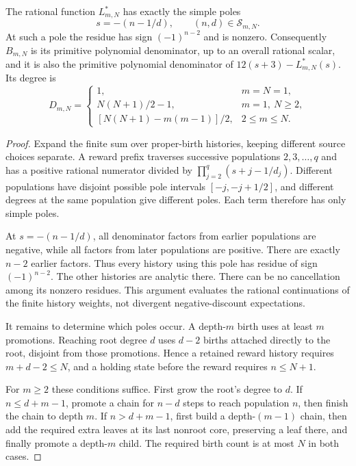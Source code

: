\begin{theorem}
\label{pop:poles}
The rational function $L^*_{m,N}$ has exactly the simple poles
\[
 s=-(n-1/d),\qquad(n,d)\in\mathcal S_{m,N}.
\]
At such a pole the residue has sign $(-1)^{n-2}$ and is nonzero.
Consequently $B_{m,N}$ is its primitive polynomial denominator,
up to an overall rational scalar, and it is also the primitive
polynomial denominator of $12(s+3)-L^*_{m,N}(s)$. Its degree is
\[
 D_{m,N}=
 \begin{cases}
 1,&m=N=1,\\
 N(N+1)/2-1,&m=1,\ N\ge2,\\
 [N(N+1)-m(m-1)]/2,&2\le m\le N.
 \end{cases}
\]
\end{theorem}
\begin{proof}
Expand the finite sum over proper-birth histories, keeping different
source choices separate. A reward prefix traverses successive
populations $2,3,\ldots,q$ and has a positive rational numerator
divided by $\prod_{j=2}^{q}(s+j-1/d_j)$. Different populations
have disjoint possible pole intervals $[-j,-j+1/2]$, and different
degrees at the same population give different poles. Each term
therefore has only simple poles.

At $s=-(n-1/d)$, all denominator factors from earlier populations
are negative, while all factors from later populations are positive.
There are exactly $n-2$ earlier factors. Thus every history using
this pole has residue of sign $(-1)^{n-2}$. The other histories are
analytic there. There can be no cancellation among its nonzero
residues. This argument evaluates the rational continuations of the
finite history weights, not divergent negative-discount expectations.

It remains to determine which poles occur. A depth-$m$ birth uses
at least $m$ promotions. Reaching root degree $d$ uses $d-2$ births
attached directly to the root, disjoint from those promotions.
Hence a retained reward history requires $m+d-2\le N$, and a
holding state before the reward requires $n\le N+1$.

For $m\ge2$ these conditions suffice. First grow the root's degree
to $d$. If $n\le d+m-1$, promote a chain for $n-d$ steps to reach
population $n$, then finish the chain to depth $m$. If
$n>d+m-1$, first build a depth-$(m-1)$ chain, then add the required
extra leaves at its last nonroot core, preserving a leaf there, and
finally promote a depth-$m$ child. The required birth count is at
most $N$ in both cases.


\end{proof}
